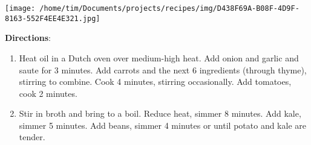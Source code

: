 \documentclass[11pt, twoside, openany]{book}
\begin{document}
\begin{minipage}[t]{\linewidth}
\begin{minipage}[t]{0.78\linewidth}
\end{minipage}
\noindent\begin{minipage}[t]{0.18\linewidth}
\centering \strut\vspace*{-\baselineskip}\newline
\texttt{[image: /home/tim/Documents/projects/recipes/img/D438F69A-B08F-4D9F-8163-552F4EE4E321.jpg]}\\
\end{minipage}\vspace{3mm}
\textbf{Directions}:
\vspace{-3mm}\begin{enumerate}\setlength\itemsep{-1mm}
\item Heat oil in a Dutch oven over medium-high heat. Add onion and garlic and saute for 3 minutes. Add carrots and the next 6 ingredients (through thyme), stirring to combine. Cook 4 minutes, stirring occasionally. Add tomatoes, cook 2 minutes.
\item Stir in broth and bring to a boil. Reduce heat, simmer 8 minutes. Add kale, simmer 5 minutes. Add beans, simmer 4 minutes or until potato and kale are tender. 
\end{enumerate}
\end{minipage}\vspace{8mm}
\end{document}
